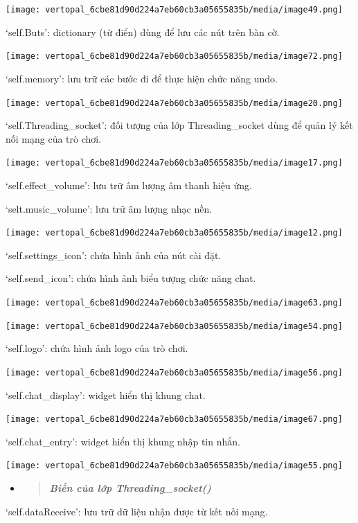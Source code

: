 \documentclass[a4paper]{article}
\begin{document}
\texttt{[image: vertopal\_6cbe81d90d224a7eb60cb3a05655835b/media/image49.png]}

`self.Buts': dictionary (từ điển) dùng để lưu các nút trên bàn cờ.

\texttt{[image: vertopal\_6cbe81d90d224a7eb60cb3a05655835b/media/image72.png]}

`self.memory': lưu trữ các bước đi để thực hiện chức năng undo.

\texttt{[image: vertopal\_6cbe81d90d224a7eb60cb3a05655835b/media/image20.png]}

`self.Threading\_socket': đối tượng của lớp Threading\_socket dùng để
quản lý kết nối mạng của trò chơi.

\texttt{[image: vertopal\_6cbe81d90d224a7eb60cb3a05655835b/media/image17.png]}

`self.effect\_volume': lưu trữ âm lượng âm thanh hiệu ứng.

`selt.music\_volume': lưu trữ âm lượng nhạc nền.

\texttt{[image: vertopal\_6cbe81d90d224a7eb60cb3a05655835b/media/image12.png]}

`self.settings\_icon': chứa hình ảnh của nút cài đặt.

`self.send\_icon': chứa hình ảnh biểu tượng chức năng chat.

\texttt{[image: vertopal\_6cbe81d90d224a7eb60cb3a05655835b/media/image63.png]}

\texttt{[image: vertopal\_6cbe81d90d224a7eb60cb3a05655835b/media/image54.png]}

`self.logo': chứa hình ảnh logo của trò chơi.

\texttt{[image: vertopal\_6cbe81d90d224a7eb60cb3a05655835b/media/image56.png]}

`self.chat\_display': widget hiển thị khung chat.

\texttt{[image: vertopal\_6cbe81d90d224a7eb60cb3a05655835b/media/image67.png]}

`self.chat\_entry': widget hiển thị khung nhập tin nhắn.

\texttt{[image: vertopal\_6cbe81d90d224a7eb60cb3a05655835b/media/image55.png]}

\begin{itemize}
\item
  \begin{quote}
  \emph{\textbf{Biến của lớp Threading\_socket()}}
  \end{quote}
\end{itemize}

`self.dataReceive': lưu trữ dữ liệu nhận được từ kết nối mạng.
\end{document}
